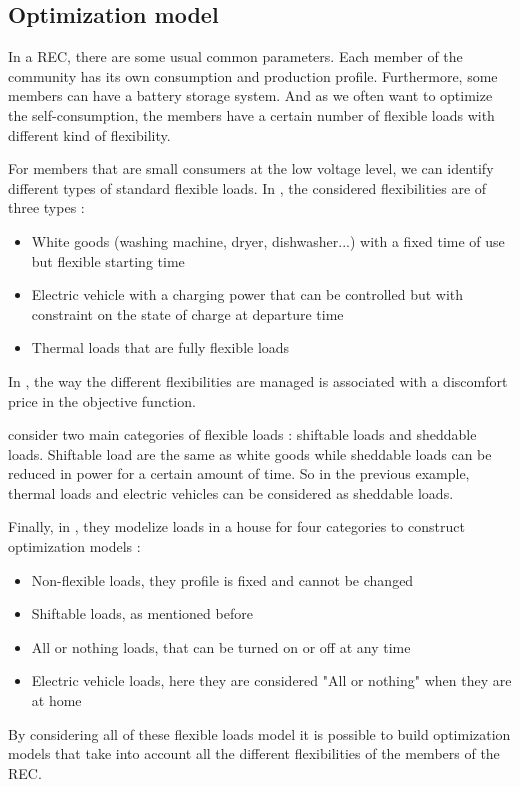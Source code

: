 
\subsection{Optimization model}
\label{section_optimization}

In a REC, there are some usual common parameters. Each member of the community has its own consumption and production profile. Furthermore, some members can have a battery storage system. And as we often want to optimize the self-consumption, the members have a certain number of flexible loads with different kind of flexibility. 

For members that are small consumers at the low voltage level, we can identify different types of standard flexible loads. In \cite{article_6}, the considered flexibilities are of three types : 
\begin{itemize}
    \item{White goods (washing machine, dryer, dishwasher...) with a fixed time of use but flexible starting time}
    \item {Electric vehicle with a charging power that can be controlled but with constraint on the state of charge at departure time}
    \item {Thermal loads that are fully flexible loads}
\end{itemize}
In \cite{article_6}, the way the different flexibilities are managed is associated with a discomfort price in the objective function.

\cite{article_9} consider two main categories of flexible loads : shiftable loads and sheddable loads. Shiftable load are the same as white goods while sheddable loads can be reduced in power for a certain amount of time. So in the previous example, thermal loads and electric vehicles can be considered as sheddable loads.

Finally, in \cite{these_sorel}, they modelize loads in a house for four categories to construct optimization models : 
\begin{itemize}
    \item {Non-flexible loads, they profile is fixed and cannot be changed}
    \item {Shiftable loads, as mentioned before}
    \item {All or nothing loads, that can be turned on or off at any time}
    \item {Electric vehicle loads, here they are considered "All or nothing" when they are at home}
\end{itemize}
By considering all of these flexible loads model it is possible to build optimization models that take into account all the different flexibilities of the members of the REC.

